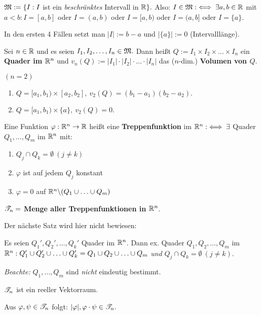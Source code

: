 \documentclass[a4paper,twoside,DIV15,BCOR12mm]{scrbook}
\begin{document}
\begin{definition}
\begin{liste}
\item $\mathfrak{M}:=\{I:I$ ist ein \emph{beschränktes} Intervall in $\mathbb{R}\}.$ Also: $I\in\mathfrak{M}:\iff\exists a,b\in\mathbb{R}$ mit $a<b: I=[a,b]$ oder $I=(a,b)$ oder $I=[a,b)$ oder $I=(a,b]$ oder $I=\{a\}.$

In den ersten 4 Fällen setzt man $|I|:=b-a$ und $|\{a\}|:=0$ (Intervalllänge).

\item Sei $n\in\mathbb{R}$ und es seien $I_1,I_2,\ldots,I_n\in\mathfrak{M}.$ Dann heißt $Q:=I_1\times I_2\times \ldots \times I_n$ ein \textbf{Quader im $\mathbb{R}^n$} und $v_n(Q):=|I_1|\cdot |I_2|\cdot \ldots \cdot |I_n|$ das ($n$-dim.) \textbf{Volumen von $Q$}.
\begin{beispiel}
$(n=2)$
\begin{enumerate}
\item $Q = [a_1,b_1) \times [a_2,b_2],\ v_2(Q) = (b_1-a_1)(b_2-a_2).$
\item $Q = [a_1,b_1) \times \{a\},\ v_2(Q) = 0.$
\end{enumerate}
\end{beispiel}

\item Eine Funktion $\varphi:\mathbb{R}^n\to\mathbb{R}$ heißt eine \textbf{Treppenfunktion} im $\mathbb{R}^n :\iff \exists$ Quader $Q_1,\ldots,Q_m$ im $\mathbb{R}^n$ mit:
\begin{enumerate}
\item $Q_j\cap Q_k=\emptyset\ (j\ne k)$
\item $\varphi$ ist auf jedem $Q_j$ konstant
\item $\varphi=0$ auf $\mathbb{R}^n\backslash(Q_1\cup\ldots\cup Q_m)$
\end{enumerate}

$\mathscr{T}_n =$ \textbf{Menge aller Treppenfunktionen in $\mathbb{R}^n$}.

\end{liste}
\end{definition}

Der nächste Satz wird hier nicht bewiesen:

\begin{satz}
\begin{liste}
\item Es seien $Q_1',Q_2',\ldots,Q_k'$ Quader im $\mathbb{R}^n$. Dann ex. Quader $Q_1,Q_2,\ldots,Q_m$ im $\mathbb{R}^n: Q_1'\cup Q_2'\cup\ldots\cup Q_k' = Q_1\cup Q_2\cup\ldots\cup Q_m$ \emph{und} $Q_j\cap Q_k = \emptyset\ (j\ne k).$

\emph{Beachte:} $Q_1,\ldots,Q_m$ sind \emph{nicht} eindeutig bestimmt.

\item $\mathscr{T}_n$ ist ein reeller Vektorraum.

\item Aus $\varphi,\psi \in\mathscr{T}_n$ folgt: $|\varphi|,\varphi\cdot\psi\in\mathscr{T}_n.$
\end{liste}
\end{satz}
\end{document}

